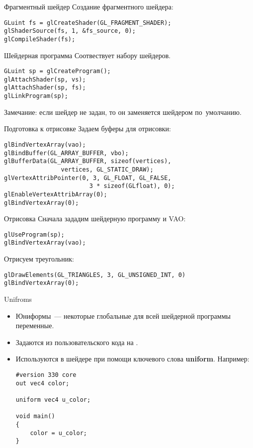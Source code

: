 \documentclass{beamer}
\begin{document}
\begin{frame}[fragile]{Фрагментный шейдер}
    Создание фрагментного шейдера:
    {\small \begin{lstlisting}
GLuint fs = glCreateShader(GL_FRAGMENT_SHADER);
glShaderSource(fs, 1, &fs_source, 0);
glCompileShader(fs);
    \end{lstlisting}}
\end{frame}

\begin{frame}[fragile]{Шейдерная программа}
    Соотвествует набору шейдеров.
    {\small \begin{lstlisting}
GLuint sp = glCreateProgram();
glAttachShader(sp, vs);
glAttachShader(sp, fs);
glLinkProgram(sp);
    \end{lstlisting}}
    Замечание: если шейдер не задан, то он заменяется шейдером по~умолчанию.
\end{frame}

\begin{frame}[fragile]{Подготовка к отрисовке}
    Задаем буферы для отрисовки:
    {\small \begin{lstlisting}
glBindVertexArray(vao);
glBindBuffer(GL_ARRAY_BUFFER, vbo); 
glBufferData(GL_ARRAY_BUFFER, sizeof(vertices),
                vertices, GL_STATIC_DRAW); 
glVertexAttribPointer(0, 3, GL_FLOAT, GL_FALSE,
                        3 * sizeof(GLfloat), 0);
glEnableVertexAttribArray(0);
glBindVertexArray(0);
    \end{lstlisting}}
\end{frame}

\begin{frame}[fragile]{Отрисовка}
    Сначала зададим шейдерную программу и VAO:
    {\small \begin{lstlisting}
glUseProgram(sp); 
glBindVertexArray(vao); 
    \end{lstlisting}}
    Отрисуем треугольник:
    {\small \begin{lstlisting}
glDrawElements(GL_TRIANGLES, 3, GL_UNSIGNED_INT, 0)
glBindVertexArray(0);
    \end{lstlisting}}
\end{frame}

\begin{frame}[fragile]{Unifroms}
    \begin{itemize}
        \item Юниформы~--- некоторые глобальные для всей шейдерной программы переменные.
        \item Задаются из пользовательского кода на \langcpp.
        \item Используются в шейдере при помощи ключевого слова {\bf uniform}. Например:
            {\small \begin{lstlisting}
#version 330 core
out vec4 color;

uniform vec4 u_color;

void main()
{
    color = u_color;
}
            \end{lstlisting}}
    \end{itemize}
\end{frame}
\end{document}
